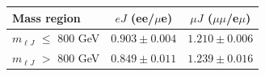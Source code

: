 \begin{table}[htp]
  \label{tab:emu_tf_boosted_perchannel_RunIII2024Summer24}
  \centering
  \begin{tabular}{l | c c}
    \hline
    Mass region & $eJ$ (ee/$\mu$e) & $\mu J$ ($\mu\mu$/e$\mu$) \\
    \hline
    $m_{\ell J}$ $\leq$ 800 GeV & $0.903 \pm 0.004$ & $1.210 \pm 0.006$ \\
    $m_{\ell J}$ $>$ 800 GeV & $0.849 \pm 0.011$ & $1.239 \pm 0.016$ \\
    \hline
  \end{tabular}
\end{table}

